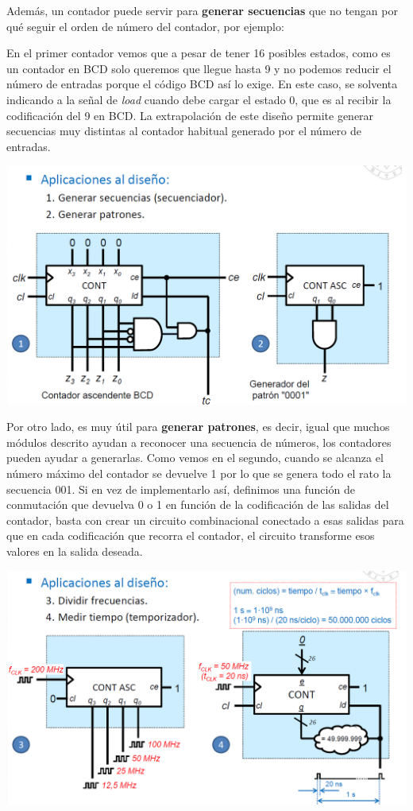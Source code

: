 \documentclass[a4paper,10pt]{book}
\begin{document}
Además, un contador puede servir para \textbf{generar secuencias} que no tengan por qué seguir el orden de número del contador, por ejemplo:

En el primer contador vemos que a pesar de tener 16 posibles estados, como es un contador en BCD solo queremos que llegue hasta 9 y no podemos reducir el número de entradas porque el código BCD así lo exige. En este caso, se solventa indicando a la señal de \textit{load} cuando debe cargar el estado $0$, que es al recibir la codificación del 9 en BCD. La extrapolación de este diseño permite generar secuencias muy distintas al contador habitual generado por el número de entradas.
\begin{center}
\includegraphics[scale=0.40]{aplicaciones contador 1}
\end{center}

Por otro lado, es muy útil para \textbf{generar patrones}, es decir, igual que muchos  módulos descrito ayudan a reconocer una secuencia de números, los contadores pueden ayudar a generarlas. Como vemos en el segundo, cuando se alcanza el número máximo del contador se devuelve 1 por lo que se genera todo el rato la secuencia 001. Si en vez de implementarlo así, definimos una función de conmutación que devuelva 0 o 1 en función de la codificación de las salidas del contador, basta con crear un circuito combinacional conectado a esas salidas para que en cada codificación que recorra el contador, el circuito transforme esos valores en la salida deseada.

\begin{center}
\includegraphics[scale=0.45]{aplicaciones contador 2}
\end{center}
\end{document}
